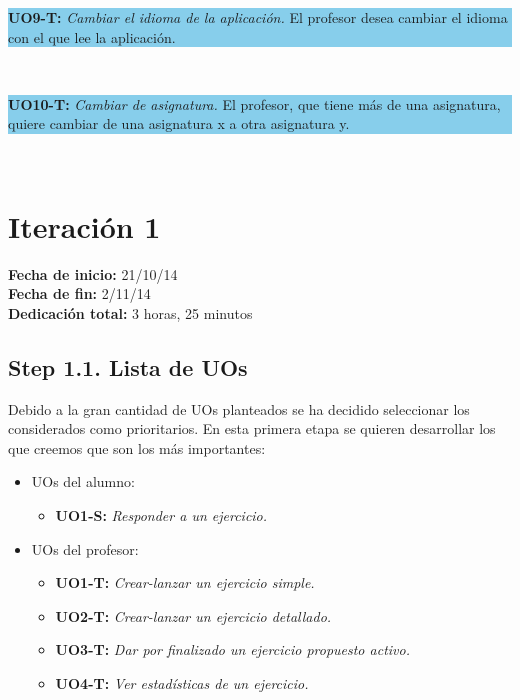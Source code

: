 \vspace{0.1cm}

\colorbox{SkyBlue}{\parbox[c]{1.0\textwidth}{
\textbf{UO9-T:} \textit{Cambiar el idioma de la aplicación.} El profesor desea cambiar el idioma con el que lee la aplicación.\\
}}\\

\vspace{0.1cm}

\colorbox{SkyBlue}{\parbox[c]{1.0\textwidth}{
\textbf{UO10-T:} \textit{Cambiar de asignatura.} El profesor, que tiene más de una asignatura, quiere cambiar de una asignatura x a otra asignatura y.\\
}}\\


\section{Iteración 1}
\label{it1}

\begin{flushleft}
\textbf{Fecha de inicio:} 21/10/14\\
\textbf{Fecha de fin:} 2/11/14\\
\textbf{Dedicación total:} 3 horas, 25 minutos\\
\end{flushleft}

\subsection{Step 1.1. Lista de UOs}
\label{it1:1.1}

Debido a la gran cantidad de UOs planteados se ha decidido seleccionar los considerados como prioritarios. En esta primera etapa se quieren desarrollar los que creemos que son los más importantes:

\begin{itemize}
\item UOs del alumno:
	\begin{itemize}
	\item \textbf{UO1-S:} \textit{Responder a un ejercicio.}
	\end{itemize}
\item UOs del profesor:
	\begin{itemize}
	\item \textbf{UO1-T:} \textit{Crear-lanzar un ejercicio simple.}
	\item \textbf{UO2-T:} \textit{Crear-lanzar un ejercicio detallado.}
	\item \textbf{UO3-T:} \textit{Dar por finalizado un ejercicio propuesto activo.}
	\item \textbf{UO4-T:} \textit{Ver estadísticas de un ejercicio.}
	\end{itemize}
\end{itemize}

